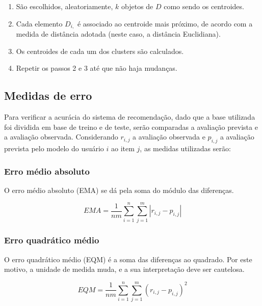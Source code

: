 \documentclass[12pt,a4paper,header]{abnt}
\begin{document}
\begin{enumerate}

\item{São escolhidos, aleatoriamente, $k$ objetos de $D$ como sendo os centroides.}
\item{Cada elemento $D_{i,}$ é associado ao centroide mais próximo, de acordo com a medida de distância adotada (neste caso, a distância Euclidiana).}
\item{Os centroides de cada um dos clusters são calculados.}
\item{Repetir os passos 2 e 3 até que não haja mudanças.}

\end{enumerate}

\subsection{Medidas de erro}

Para verificar a acurácia do sistema de recomendação, dado que a base utilizada foi dividida em base de treino e de teste, serão comparadas a avaliação prevista e a avaliação observada. Considerando $r_{i,j}$ a avaliação observada e $p_{i,j}$ a avaliação prevista pelo modelo do usuário $i$ ao item $j$, as medidas utilizadas serão\cite{gorakala2015building}:

\subsubsection{Erro médio absoluto}

O erro médio absoluto (EMA) se dá pela soma do módulo das diferenças. 

\begin{equation}
EMA = \frac{1}{nm} \sum_{i=1}^{n} \sum_{j=1}^m \left| r_{i,j} - p_{i,j}  \right|
\end{equation}

\subsubsection{Erro quadrático médio}

O erro quadrático médio (EQM) é a soma das diferenças ao quadrado. Por este motivo, a unidade de medida muda, e a sua interpretação deve ser cautelosa.

\begin{equation}
EQM = \frac{1}{nm} \sum_{i=1}^{n} \sum_{j=1}^m \left( r_{i,j} - p_{i,j}  \right)^2
\end{equation}
\end{document}
